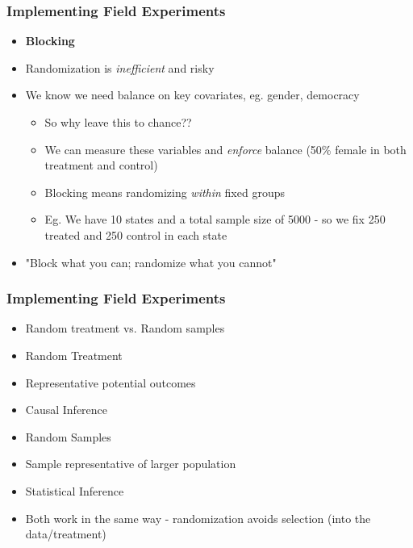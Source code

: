 \documentclass[xcolor=x11names,compress]{beamer}\usepackage[]{graphicx}\usepackage[]{color}
\renewcommand{\(}{\begin{columns}}
\renewcommand{\)}{\end{columns}}
\newcommand{\<}[1]{\begin{column}{#1}}
\renewcommand{\>}{\end{column}}
\begin{document}
\begin{frame}
\frametitle{Implementing Field Experiments}
\begin{itemize}
\item \textbf{Blocking}
\pause
\item Randomization is \textit{inefficient} and risky
\pause
\item We know we need balance on key covariates, eg. gender, democracy
\begin{itemize}
\item So why leave this to chance??
\pause
\item We can measure these variables and \textit{enforce} balance (50\% female in both treatment and control)
\pause
\item Blocking means randomizing \textit{within} fixed groups
\pause
\item Eg. We have 10 states and a total sample size of 5000 - so we fix 250 treated and 250 control in each state
\end{itemize}
\item "Block what you can; randomize what you cannot"
\end{itemize}
\end{frame}

\begin{frame}
\frametitle{Implementing Field Experiments}
\begin{itemize}
\item Random treatment vs. Random samples
\end{itemize}
\begin{multicols}{2}
\begin{itemize}
\item Random Treatment
\pause
\item Representative potential outcomes
\pause
\item Causal Inference
\end{itemize}
\columnbreak
\begin{itemize}
\item Random Samples
\pause
\item Sample representative of larger population
\pause
\item Statistical Inference
\end{itemize}
\end{multicols} 
\pause
\begin{itemize}
\item Both work in the same way - randomization avoids selection (into the data/treatment)
\end{itemize}
\end{frame}
\end{document}
